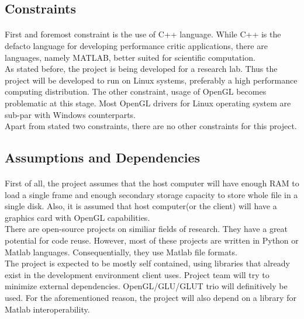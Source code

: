 \documentclass[paper=a4, fontsize=12pt]{scrartcl}	%
\numberwithin{equation}{section}		%
\numberwithin{figure}{section}			%
\numberwithin{table}{section}				%
\newcommand{\skipsubsection}[0]{\vspace{1cm}}
\begin{document}
            
    \skipsubsection 
        
	\subsection{Constraints}
    \paragraph{}
    First and foremost constraint is the use of C++ language. While C++ is the defacto language for developing performance critic applications, there are languages, namely MATLAB, better suited for scientific computation.\\
    
    As stated before, the project is being developed for a research lab. Thus the project will be developed to run on Linux systems, preferably a high performance computing distribution. The other constraint, usage of OpenGL becomes problematic at this stage. Most OpenGL drivers for Linux operating system are sub-par with Windows counterparts.\\
    
    Apart from stated two constraints, there are no other constraints for this project.\\
            
    \skipsubsection 
        
	\subsection{Assumptions and Dependencies}
	\paragraph{}
    First of all, the project assumes that the host computer will have enough RAM to load a single frame and enough secondary storage capacity to store whole file in a single disk. Also, it is assumed that host computer(or the client) will have a graphics card with OpenGL capabilities.\\
    
    There are open-source projects on similiar fields of research. They have a great potential for code reuse. However, most of these projects are written in Python or Matlab languages. Consequentially, they use Matlab file formats.\\
    
    The project is expected to be mostly self contained, using libraries that already exist in the development environment client uses. Project team will try to minimize external dependencies. OpenGL/GLU/GLUT trio will definitively be used. For the aforementioned reason, the project will also depend on a library for Matlab interoperability.\\
    
\end{document}
